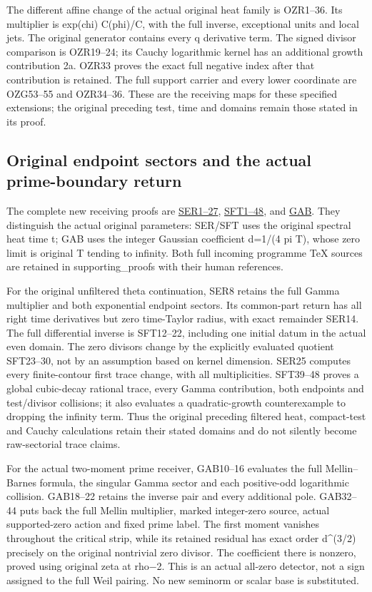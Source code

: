 \documentclass[
  10pt,
  a4paper,
]{article}
\begin{document}
The different affine change of the actual original heat family is
OZR1--36. Its multiplier is exp(chi) C(phi)/C, with the full inverse,
exceptional units and local jets. The original generator contains every
q derivative term. The signed divisor comparison is OZR19--24; its
Cauchy logarithmic kernel has an additional growth contribution 2a.
OZR33 proves the exact full negative index after that contribution is
retained. The full support carrier and every lower coordinate are
OZG53--55 and OZR34--36. These are the receiving maps for these
specified extensions; the original preceding test, time and domains
remain those stated in its proof.

\subsection{Original endpoint sectors and the actual prime-boundary
return}\label{original-endpoint-sectors-and-the-actual-prime-boundary-return}

The complete new receiving proofs are
\href{SECTORIAL_ENDPOINT_ZERO_TRACE_RETURN.md}{SER1--27},
\href{SECTORIAL_FILTER_TRACE_DERIVATION.md}{SFT1--48}, and
\href{GAUSSIAN_ARITHMETIC_BOUNDARY_RETURN.md}{GAB}. They distinguish the
actual original parameters: SER/SFT uses the original spectral heat time
t; GAB uses the integer Gaussian coefficient d=1/(4 pi T), whose zero
limit is original T tending to infinity. Both full incoming programme
TeX sources are retained in supporting\_proofs with their human
references.

For the original unfiltered theta continuation, SER8 retains the full
Gamma multiplier and both exponential endpoint sectors. Its common-part
return has all right time derivatives but zero time-Taylor radius, with
exact remainder SER14. The full differential inverse is SFT12--22,
including one initial datum in the actual even domain. The zero divisors
change by the explicitly evaluated quotient SFT23--30, not by an
assumption based on kernel dimension. SER25 computes every
finite-contour first trace change, with all multiplicities. SFT39--48
proves a global cubic-decay rational trace, every Gamma contribution,
both endpoints and test/divisor collisions; it also evaluates a
quadratic-growth counterexample to dropping the infinity term. Thus the
original preceding filtered heat, compact-test and Cauchy calculations
retain their stated domains and do not silently become raw-sectorial
trace claims.

For the actual two-moment prime receiver, GAB10--16 evaluates the full
Mellin--Barnes formula, the singular Gamma sector and each positive-odd
logarithmic collision. GAB18--22 retains the inverse pair and every
additional pole. GAB32--44 puts back the full Mellin multiplier, marked
integer-zero source, actual supported-zero action and fixed prime label.
The first moment vanishes throughout the critical strip, while its
retained residual has exact order d\^{}(3/2) precisely on the original
nontrivial zero divisor. The coefficient there is nonzero, proved using
original zeta at rho−2. This is an actual all-zero detector, not a sign
assigned to the full Weil pairing. No new seminorm or scalar base is
substituted.
\end{document}

